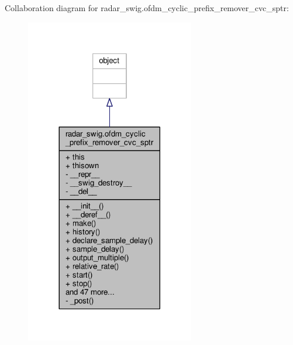 Collaboration diagram for radar\+\_\+swig.\+ofdm\+\_\+cyclic\+\_\+prefix\+\_\+remover\+\_\+cvc\+\_\+sptr\+:
\nopagebreak
\begin{figure}[H]
\begin{center}
\leavevmode
\includegraphics[width=209pt]{d2/d30/classradar__swig_1_1ofdm__cyclic__prefix__remover__cvc__sptr__coll__graph}
\end{center}
\end{figure}
